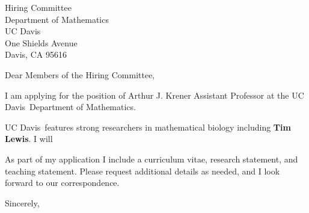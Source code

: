 \documentclass[11pt,a4paper]{letter}
\begin{document}
\def\School{UC Davis}
\begin{letter}
{Hiring Committee\\
Department of Mathematics\\
UC Davis\\
One Shields Avenue\\
Davis, CA 95616}


\opening{Dear Members of the Hiring Committee,}

I am applying for the position of Arthur J. Krener Assistant Professor at the \School~Department of Mathematics. 



\School~features strong researchers in mathematical biology including \textbf{Tim Lewis}. I will 



As part of my application I include a curriculum vitae, research statement, and teaching statement. Please request additional details as needed, and I look forward to our correspondence.

\closing{Sincerely,}
\end{letter}
\end{document}
